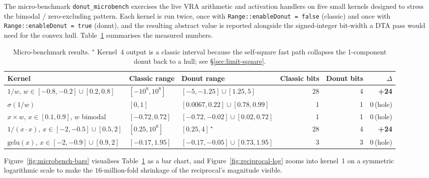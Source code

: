 \documentclass[11pt,a4paper]{article}
\theoremstyle{plain}
\begin{document}
The micro-benchmark \texttt{donut\_microbench} exercises the live VRA
arithmetic and activation handlers on five small kernels designed to
stress the bimodal / zero-excluding pattern. Each kernel is run twice,
once with \texttt{Range::enableDonut = false} (classic) and once with
\texttt{Range::enableDonut = true} (donut), and the resulting abstract
value is reported alongside the signed-integer bit-width a DTA pass
would need for the convex hull. Table~\ref{tab:microbench} summarises
the measured numbers.

\begin{table}[H]
\centering
\footnotesize
\renewcommand{\arraystretch}{1.15}
\begin{tabularx}{\linewidth}{@{}lXXrrr@{}}
\toprule
Kernel & Classic range & Donut range & Classic bits & Donut bits & $\Delta$ \\
\midrule
$1/w$, $w\in[-0.8,-0.2]\cup[0.2,0.8]$ & $[-10^8, 10^8]$ & $[-5,-1.25]\cup[1.25,5]$ & 28 & 4 & \textbf{+24} \\
$\sigma(1/w)$ & $[0,1]$ & $[0.0067,0.22]\cup[0.78,0.99]$ & 1 & 1 & 0\,(hole) \\
$x\times w$, $x\in[0.1,0.9]$, $w$ bimodal & $[-0.72,0.72]$ & $[-0.72,-0.02]\cup[0.02,0.72]$ & 1 & 1 & 0\,(hole) \\
$1/(x\cdot x)$, $x\in[-2,-0.5]\cup[0.5,2]$ & $[0.25,10^8]$ & $[0.25,4]$\,${}^\star$ & 28 & 4 & \textbf{+24} \\
$\mathrm{gelu}(x)$, $x\in[-2,-0.9]\cup[0.9,2]$ & $[-0.17,1.95]$ & $[-0.17,-0.05]\cup[0.73,1.95]$ & 3 & 3 & 0\,(hole) \\
\bottomrule
\end{tabularx}
\caption{Micro-benchmark results. ${}^\star$ Kernel~4 output is a
classic interval because the self-square fast path collapses the
1-component donut back to a hull; see \S\ref{sec:limit-square}.}
\label{tab:microbench}
\end{table}

Figure~\ref{fig:microbench-bars} visualises Table~\ref{tab:microbench}
as a bar chart, and Figure~\ref{fig:reciprocal-log} zooms into
kernel~1 on a symmetric logarithmic scale to make the $16$-million-fold
shrinkage of the reciprocal's magnitude visible.
\end{document}
